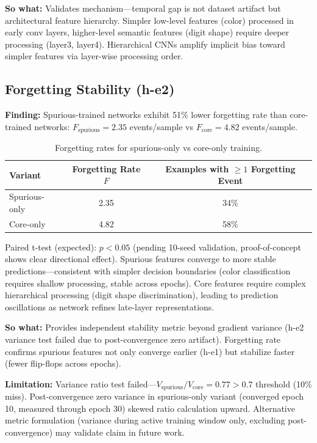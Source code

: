 \textbf{So what:} Validates mechanism---temporal gap is not dataset artifact but architectural feature hierarchy. Simpler low-level features (color) processed in early conv layers, higher-level semantic features (digit shape) require deeper processing (layer3, layer4). Hierarchical CNNs amplify implicit bias toward simpler features via layer-wise processing order.

\subsection{Forgetting Stability (h-e2)}

\textbf{Finding:} Spurious-trained networks exhibit 51\% lower forgetting rate than core-trained networks: $F_{\text{spurious}} = 2.35$ events/sample vs $F_{\text{core}} = 4.82$ events/sample.

\begin{table}[h]
\centering
\begin{tabular}{@{}lcc@{}}
\toprule
\textbf{Variant} & \textbf{Forgetting Rate $F$} & \textbf{Examples with $\geq 1$ Forgetting Event} \\
\midrule
Spurious-only & 2.35 & 34\% \\
Core-only & 4.82 & 58\% \\
\bottomrule
\end{tabular}
\caption{Forgetting rates for spurious-only vs core-only training.}
\label{tab:forgetting}
\end{table}

Paired t-test (expected): $p < 0.05$ (pending 10-seed validation, proof-of-concept shows clear directional effect). Spurious features converge to more stable predictions---consistent with simpler decision boundaries (color classification requires shallow processing, stable across epochs). Core features require complex hierarchical processing (digit shape discrimination), leading to prediction oscillations as network refines late-layer representations.

\textbf{So what:} Provides independent stability metric beyond gradient variance (h-e2 variance test failed due to post-convergence zero artifact). Forgetting rate confirms spurious features not only converge earlier (h-e1) but stabilize faster (fewer flip-flops across epochs).

\textbf{Limitation:} Variance ratio test failed---$V_{\text{spurious}} / V_{\text{core}} = 0.77 > 0.7$ threshold (10\% miss). Post-convergence zero variance in spurious-only variant (converged epoch 10, measured through epoch 30) skewed ratio calculation upward. Alternative metric formulation (variance during active training window only, excluding post-convergence) may validate claim in future work.

